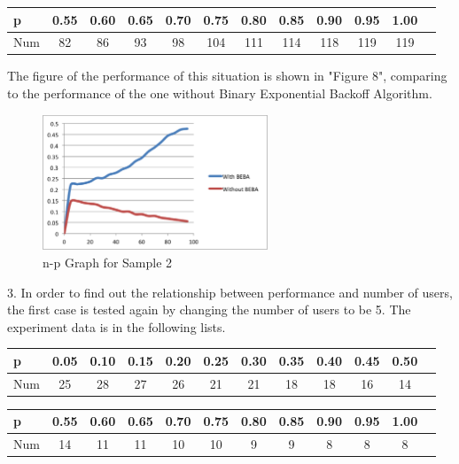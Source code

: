 \documentclass[11pt,a4paper]{report}
\begin{document}
\begin{table}[htbp]
\begin{tabular}{lccccccccccc}
\toprule
p & 0.55 & 0.60 & 0.65  & 0.70 & 0.75 & 0.80 & 0.85 & 0.90 & 0.95 & 1.00 \\
\midrule
Num & 82 & 86 & 93 & 98 & 104 & 111 & 114 & 118 & 119 & 119 \\
\bottomrule
\end{tabular}
\end{table}

The figure of the performance of this situation is shown in "Figure 8", comparing to the performance of the one without Binary Exponential Backoff Algorithm.
\begin{figure}
\centering
\includegraphics[width=0.6\textwidth]{4_3.eps}
\caption{n-p Graph for Sample 2}
\end{figure}

3. In order to find out the relationship between performance and number of users, the first case is tested again by changing the number of users to be 5. The experiment data is in the following lists. \\
\begin{table}[htbp]
\begin{tabular}{lccccccccccc}
\toprule
p & 0.05 & 0.10 & 0.15  & 0.20 & 0.25 & 0.30 & 0.35 & 0.40 & 0.45 & 0.50 \\
\midrule
Num & 25 & 28 & 27 & 26 & 21 & 21 & 18 & 18 & 16 & 14 \\
\bottomrule
\end{tabular}
\end{table}

\begin{table}[htbp]
\begin{tabular}{lccccccccccc}
\toprule
p & 0.55 & 0.60 & 0.65  & 0.70 & 0.75 & 0.80 & 0.85 & 0.90 & 0.95 & 1.00 \\
\midrule
Num & 14 & 11 & 11 & 10 & 10 & 9 & 9 & 8 & 8 & 8 \\
\bottomrule
\end{tabular}
\end{table}
\end{document}
